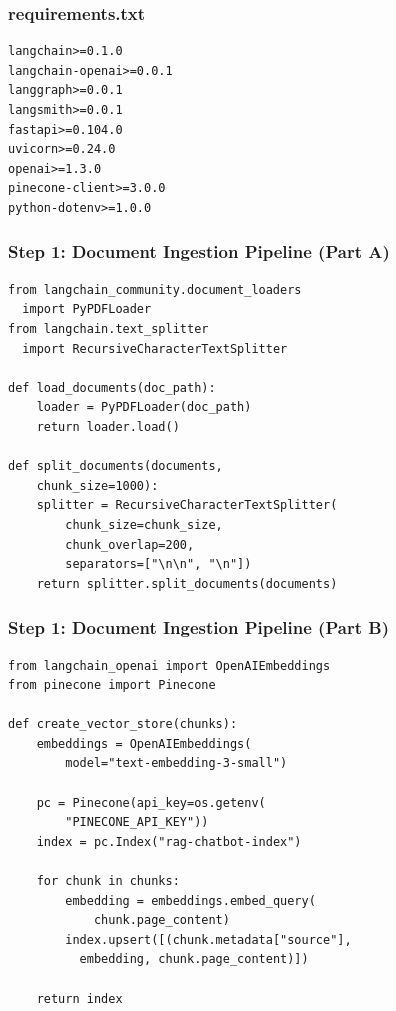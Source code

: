 \documentclass[aspectratio=169,11pt]{beamer}
\begin{document}
\begin{frame}[fragile]
  \frametitle{requirements.txt}

  \begin{lstlisting}
langchain>=0.1.0
langchain-openai>=0.0.1
langgraph>=0.0.1
langsmith>=0.0.1
fastapi>=0.104.0
uvicorn>=0.24.0
openai>=1.3.0
pinecone-client>=3.0.0
python-dotenv>=1.0.0
  \end{lstlisting}
\end{frame}

\begin{frame}[fragile]
  \frametitle{Step 1: Document Ingestion Pipeline (Part A)}

  \begin{lstlisting}
from langchain_community.document_loaders
  import PyPDFLoader
from langchain.text_splitter
  import RecursiveCharacterTextSplitter

def load_documents(doc_path):
    loader = PyPDFLoader(doc_path)
    return loader.load()

def split_documents(documents,
    chunk_size=1000):
    splitter = RecursiveCharacterTextSplitter(
        chunk_size=chunk_size,
        chunk_overlap=200,
        separators=["\n\n", "\n"])
    return splitter.split_documents(documents)
  \end{lstlisting}
\end{frame}

\begin{frame}[fragile]
  \frametitle{Step 1: Document Ingestion Pipeline (Part B)}

  \begin{lstlisting}
from langchain_openai import OpenAIEmbeddings
from pinecone import Pinecone

def create_vector_store(chunks):
    embeddings = OpenAIEmbeddings(
        model="text-embedding-3-small")

    pc = Pinecone(api_key=os.getenv(
        "PINECONE_API_KEY"))
    index = pc.Index("rag-chatbot-index")

    for chunk in chunks:
        embedding = embeddings.embed_query(
            chunk.page_content)
        index.upsert([(chunk.metadata["source"],
          embedding, chunk.page_content)])

    return index
  \end{lstlisting}
\end{frame}
\end{document}
